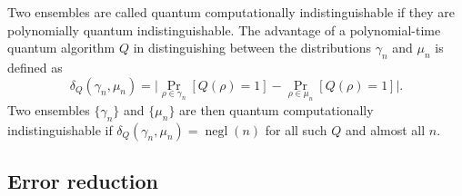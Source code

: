 \documentclass[11pt]{article}
\theoremstyle{plain}
\theoremstyle{definition}
\DeclareMathOperator{\negl}{negl} %
\begin{document}
Two ensembles are called quantum computationally indistinguishable if they are polynomially quantum indistinguishable. The advantage of a polynomial-time quantum algorithm $Q$ in distinguishing between the distributions $\gamma_n$ and $\mu_n$ is defined as
\[ \delta_Q(\gamma_n, \mu_n) = \Big| \Pr_{\rho \in \gamma_n}[Q(\rho) = 1] - \Pr_{\rho \in \mu_n}[Q(\rho) = 1] \Big|. \]
Two ensembles $\{ \gamma_n \}$ and $\{ \mu_n \}$ are then quantum computationally indistinguishable if $\delta_Q(\gamma_n, \mu_n) = \negl(n)$ for all such $Q$ and almost all $n$. 



\subsection{Error reduction}
\label{sec:err-red}
\end{document}
